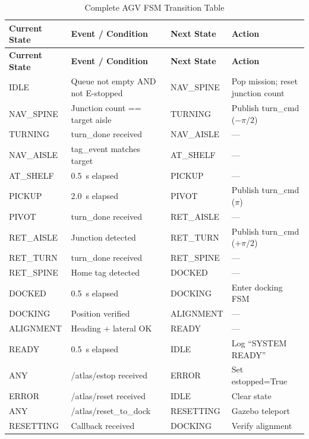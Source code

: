 \documentclass[12pt,a4paper,oneside]{report}
\begin{document}
\begin{longtable}{p{2.5cm} p{4.5cm} p{2.5cm} p{3.5cm}}
\caption{Complete AGV FSM Transition Table} \label{tab:fsm_complete} \\
\toprule
\textbf{Current State} & \textbf{Event / Condition} & \textbf{Next State} & \textbf{Action} \\
\midrule
\endfirsthead
\toprule
\textbf{Current State} & \textbf{Event / Condition} & \textbf{Next State} & \textbf{Action} \\
\midrule
\endhead
IDLE & Queue not empty AND not E-stopped & NAV\_SPINE & Pop mission; reset junction count \\
NAV\_SPINE & Junction count == target aisle & TURNING & Publish turn\_cmd ($-\pi/2$) \\
TURNING & turn\_done received & NAV\_AISLE & --- \\
NAV\_AISLE & tag\_event matches target & AT\_SHELF & --- \\
AT\_SHELF & 0.5~s elapsed & PICKUP & --- \\
PICKUP & 2.0~s elapsed & PIVOT & Publish turn\_cmd ($\pi$) \\
PIVOT & turn\_done received & RET\_AISLE & --- \\
RET\_AISLE & Junction detected & RET\_TURN & Publish turn\_cmd ($+\pi/2$) \\
RET\_TURN & turn\_done received & RET\_SPINE & --- \\
RET\_SPINE & Home tag detected & DOCKED & --- \\
DOCKED & 0.5~s elapsed & DOCKING & Enter docking FSM \\
DOCKING & Position verified & ALIGNMENT & --- \\
ALIGNMENT & Heading + lateral OK & READY & --- \\
READY & 0.5~s elapsed & IDLE & Log ``SYSTEM READY'' \\
ANY & /atlas/estop received & ERROR & Set estopped=True \\
ERROR & /atlas/reset received & IDLE & Clear state \\
ANY & /atlas/reset\_to\_dock & RESETTING & Gazebo teleport \\
RESETTING & Callback received & DOCKING & Verify alignment \\
\bottomrule
\end{longtable}
\end{document}
